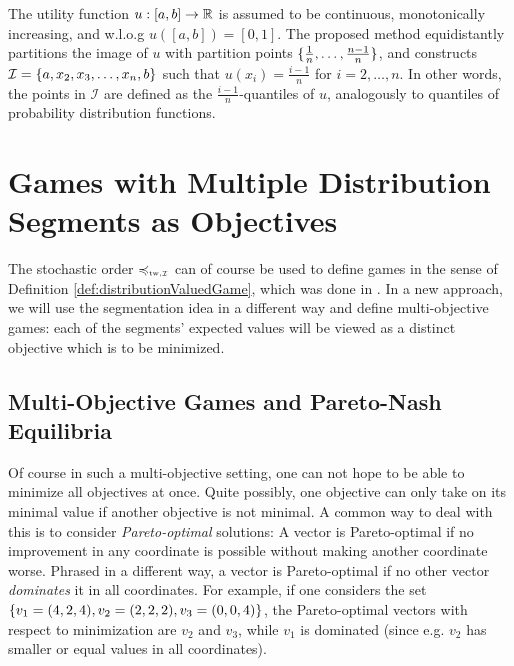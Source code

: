 \documentclass[a4paper]{scrreprt}
\theoremstyle{definition}
\begin{document}
    The utility function $u: [a, b] \to \mathbb{R}$ is assumed to be continuous, monotonically increasing, and w.l.o.g $u([a, b]) = [0, 1]$.
    The proposed method equidistantly partitions the image of $u$ with partition points $\{\frac{1}{n}, \dots, \frac{n-1}{n}\}$, and constructs $\mathcal{I} = \{a, x_2, x_3, \dots, x_n, b\}$ such that $u(x_i) = \frac{i-1}{n}$ for $i = 2, \dots, n$.
    In other words, the points in $\mathcal{I}$ are defined as the $\frac{i-1}{n}$-quantiles of $u$, analogously to quantiles of probability distribution functions.
    
    \section{Games with Multiple Distribution Segments as Objectives}
    The stochastic order $\leqtw$ can of course be used to define games in the sense of Definition \ref{def:distributionValuedGame}, which was done in \cite{bib:tweakableStochasticOrders}.
    In a new approach, we will use the segmentation idea in a different way and define multi-objective games: each of the segments' expected values will be viewed as a distinct objective which is to be minimized.
    
    \subsection{Multi-Objective Games and Pareto-Nash Equilibria}
    Of course in such a multi-objective setting, one can not hope to be able to minimize all objectives at once. Quite possibly, one objective can only take on its minimal value if another objective is not minimal. A common way to deal with this is to consider \emph{Pareto-optimal} solutions:
    A vector is Pareto-optimal if no improvement in any coordinate is possible without making another coordinate worse. Phrased in a different way, a vector is Pareto-optimal if no other vector \emph{dominates} it in all coordinates.
    For example, if one considers the set $\{v_1 = (4, 2, 4), v_2 = (2, 2, 2), v_3 = (0, 0, 4)\}$, the Pareto-optimal vectors with respect to minimization are $v_2$ and $v_3$, while $v_1$ is dominated (since e.g. $v_2$ has smaller or equal values in all coordinates).
    
\end{document}
